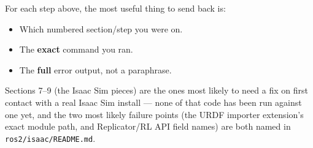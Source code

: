 \documentclass[11pt]{article}
\begin{document}
For each step above, the most useful thing to send back is:
\begin{itemize}
  \item Which numbered section/step you were on.
  \item The \textbf{exact} command you ran.
  \item The \textbf{full} error output, not a paraphrase.
\end{itemize}

Sections 7--9 (the Isaac Sim pieces) are the ones most likely to need a
fix on first contact with a real Isaac Sim install --- none of that code
has been run against one yet, and the two most likely failure points
(the URDF importer extension's exact module path, and Replicator/RL API
field names) are both named in \texttt{ros2/isaac/README.md}.
\end{document}
